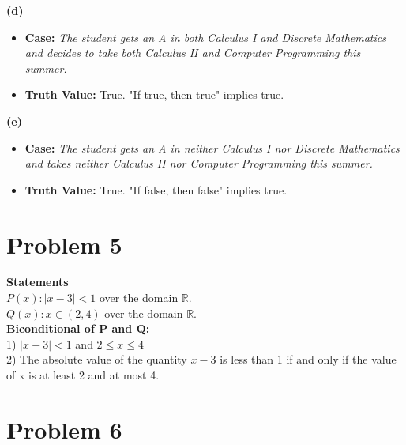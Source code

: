 \documentclass[11pt]{article}
\begin{document}
\textbf{(d)}
\begin{itemize}
    \item \textbf{Case:} \textit{The student gets an A in both Calculus I and Discrete Mathematics and decides to take both Calculus II and Computer Programming this summer.}
    \item \textbf{Truth Value:}  True. "If true, then true" implies true.
\end{itemize}

\textbf{(e)}
\begin{itemize}
    \item \textbf{Case:} \textit{The student gets an A in neither Calculus I nor Discrete Mathematics and takes neither Calculus II nor Computer Programming this summer.}
    \item \textbf{Truth Value:}  True. "If false, then false" implies true.
\end{itemize}

\newpage


\section*{Problem 5}

\textbf{Statements}\\
$P(x) : |x-3| < 1$ over the domain $\mathbb{R}$.\\
$Q(x) : x \in (2, 4)$ over the domain $\mathbb{R}$.\\

\textbf{Biconditional of P and Q:}\\
1) $|x-3| < 1$ and $ 2 \leq x \leq 4 $ \\
2) The absolute value of the quantity $x-3$ is less than 1 if and only if the value of x is at least 2 and at most 4.


\newpage


\section*{Problem 6}
\end{document}
